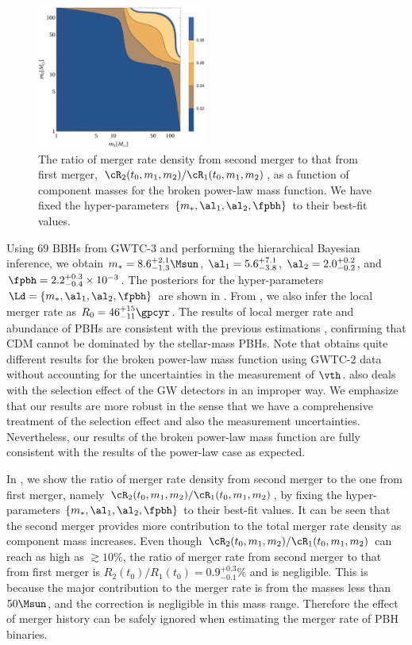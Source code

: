 \documentclass[twocolumn]{aastex631}
\begin{document}
\begin{figure}[tbp!]
	\centering
	\includegraphics[width=0.5\textwidth]{ratio-bpower.pdf}
	\caption{\label{ratio-bpower}The ratio of merger rate density from second merger to that from first merger, $\cR_2(t_0, m_1, m_2)/\cR_1(t_0, m_1, m_2)$, as a function of component masses for the broken power-law mass function. We have fixed the hyper-parameters $\{m_*, \al_1, \al_2, \fpbh\}$ to their best-fit values.}
\end{figure}

Using $69$ BBHs from GWTC-3 and performing the hierarchical Bayesian inference, we obtain $m_* = 8.6^{+2.1}_{-1.3} \Msun$, $\al_1 = 5.6^{+7.1}_{-3.8}$, $\al_2 = 2.0^{+0.2}_{-0.2}$, and $\fpbh = 2.2^{+0.3}_{-0.4} \times 10^{-3}$. The posteriors for the hyper-parameters $\Ld = \{m_*, \al_1, \al_2, \fpbh\}$ are shown in . From , we also infer the local merger rate as $R_0 = 46^{+15}_{-11} \gpcyr$. The results of local merger rate and abundance of PBHs are consistent with the previous estimations \citep{Chen:2018czv,Chen:2018rzo,Chen:2019irf,Wu:2020drm,Chen:2021nxo,Chen:2022fda}, confirming that CDM cannot be dominated by the stellar-mass PBHs. Note that \cite{Deng:2021ezy} obtains quite different results for the broken power-law mass function using GWTC-2 data without accounting for the uncertainties in the measurement of $\vth$. \cite{Deng:2021ezy} also deals with the selection effect of the GW detectors in an improper way. We emphasize that our results are more robust in the sense that we have a comprehensive treatment of the selection effect and also the measurement uncertainties. Nevertheless, our results of the broken power-law mass function are fully consistent with the results of the power-law case as expected.


In , we show the ratio of merger rate density from second merger to the one from first merger, namely $\cR_2(t_0, m_1, m_2)/\cR_1(t_0, m_1, m_2)$, by fixing the hyper-parameters $\{m_*, \al_1, \al_2, \fpbh\}$ to their best-fit values. It can be seen that the second merger provides more contribution to the total merger rate density as component mass increases. Even though $\cR_2(t_0, m_1, m_2)/\cR_1(t_0, m_1, m_2)$ can reach as high as $\gtrsim 10\%$, the ratio of merger rate from second merger to that from first merger is $R_2(t_0)/R_1(t_0) = 0.9^{+0.3}_{-0.1}\%$ and is negligible. This is because the major contribution to the merger rate is from the masses less than $50\Msun$, and the correction is negligible in this mass range. Therefore the effect of merger history can be safely ignored when estimating the merger rate of PBH binaries.
\end{document}
